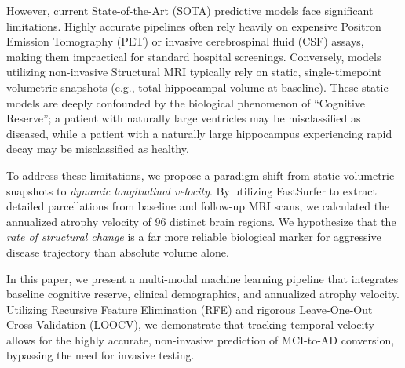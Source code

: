 \documentclass[11pt, a4paper]{article}
\begin{document}
However, current State-of-the-Art (SOTA) predictive models face significant limitations. Highly accurate pipelines often rely heavily on expensive Positron Emission Tomography (PET) or invasive cerebrospinal fluid (CSF) assays, making them impractical for standard hospital screenings. Conversely, models utilizing non-invasive Structural MRI typically rely on static, single-timepoint volumetric snapshots (e.g., total hippocampal volume at baseline). These static models are deeply confounded by the biological phenomenon of ``Cognitive Reserve''; a patient with naturally large ventricles may be misclassified as diseased, while a patient with a naturally large hippocampus experiencing rapid decay may be misclassified as healthy.

To address these limitations, we propose a paradigm shift from static volumetric snapshots to \textit{dynamic longitudinal velocity}. By utilizing FastSurfer to extract detailed parcellations from baseline and follow-up MRI scans, we calculated the annualized atrophy velocity of 96 distinct brain regions. We hypothesize that the \textit{rate of structural change} is a far more reliable biological marker for aggressive disease trajectory than absolute volume alone.

In this paper, we present a multi-modal machine learning pipeline that integrates baseline cognitive reserve, clinical demographics, and annualized atrophy velocity. Utilizing Recursive Feature Elimination (RFE) and rigorous Leave-One-Out Cross-Validation (LOOCV), we demonstrate that tracking temporal velocity allows for the highly accurate, non-invasive prediction of MCI-to-AD conversion, bypassing the need for invasive testing.
\end{document}
